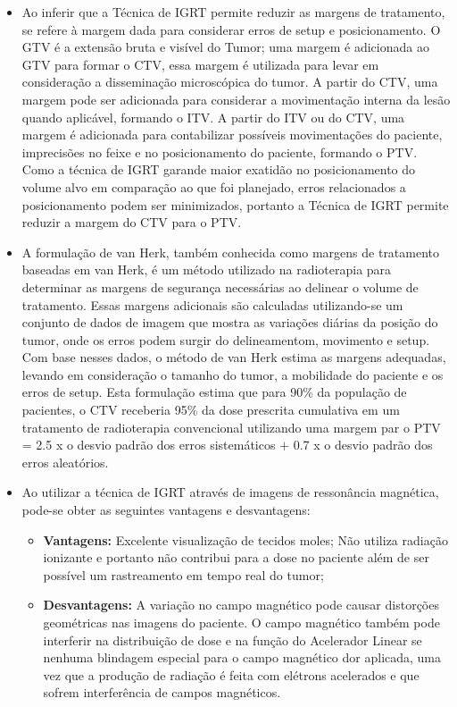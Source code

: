 \documentclass[11pt,a4paper]{article}
\newcounter{exemplo}
\begin{document}
\begin{exemplo}[12. IGRT ]
\begin{itemize}
        \item Ao inferir que a Técnica de IGRT permite reduzir as margens de tratamento, se refere à margem dada para considerar erros de setup e posicionamento. O GTV é a extensão bruta e visível do Tumor; uma margem é adicionada ao GTV para formar o CTV, essa margem é utilizada para levar em consideração a disseminação microscópica do tumor. A partir do CTV, uma margem pode ser adicionada para considerar a movimentação interna da lesão quando aplicável, formando o ITV. A partir do ITV ou do CTV, uma margem é adicionada para contabilizar possíveis movimentações do paciente, imprecisões no feixe e no posicionamento do paciente, formando o PTV. Como a técnica de IGRT garande maior exatidão no posicionamento do volume alvo em comparação ao que foi planejado, erros relacionados a posicionamento podem ser minimizados, portanto a Técnica de IGRT permite reduzir a margem do CTV para o PTV.
        
        \item A formulação de van Herk, também conhecida como margens de tratamento baseadas em van Herk, é um método utilizado na radioterapia para determinar as margens de segurança necessárias ao delinear o volume de tratamento. Essas margens adicionais são calculadas utilizando-se um conjunto de dados de imagem que mostra as variações diárias da posição do tumor, onde os erros podem surgir do delineamentom, movimento e setup. Com base nesses dados, o método de van Herk estima as margens adequadas, levando em consideração o tamanho do tumor, a mobilidade do paciente e os erros de setup. Esta formulação estima que para 90\% da população de pacientes, o CTV receberia 95\% da dose prescrita cumulativa em um tratamento de radioterapia convencional utilizando uma margem par o PTV = 2.5 x o desvio padrão dos erros sistemáticos $+$ 0.7 x o desvio padrão dos erros aleatórios.
        
        \item Ao utilizar a técnica de IGRT através de imagens de ressonância magnética, pode-se obter as seguintes vantagens e desvantagens:
            \begin{itemize}[label=\textcolor{CarnationPink}{$\blacktriangleright$}]
                \item \textbf{Vantagens:} Excelente visualização de tecidos moles; Não utiliza radiação ionizante e portanto não contribui para a dose no paciente além de ser possível um rastreamento em tempo real do tumor;
                \item \textbf{Desvantagens:} A variação no campo magnético pode causar distorções geométricas nas imagens do paciente. O campo magnético também pode interferir na distribuição de dose e na função do Acelerador Linear se nenhuma blindagem especial para o campo magnético dor aplicada, uma vez que a produção de radiação é feita com elétrons acelerados e que sofrem interferência de campos magnéticos.
            \end{itemize}


\end{itemize}
\end{exemplo}
\end{document}
